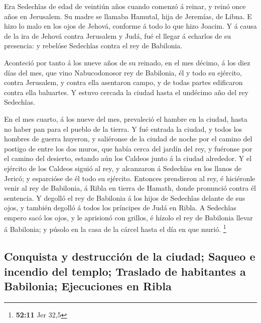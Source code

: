  Era Sedechîas de edad de veintiún años cuando comenzó á
reinar, y reinó once años en Jerusalem. Su madre se llamaba Hamutal,
hija de Jeremías, de Libna.  E hizo lo malo en los ojos de
Jehová, conforme á todo lo que hizo Joacim.  Y á causa de
la ira de Jehová contra Jerusalem y Judá, fué el llegar á echarlos de su
presencia: y rebelóse Sedechîas contra el rey de Babilonia.

 Aconteció por tanto á los nueve años de su reinado, en el
mes décimo, á los diez días del mes, que vino Nabucodonosor rey de
Babilonia, él y todo su ejército, contra Jerusalem, y contra ella
asentaron campo, y de todas partes edificaron contra ella baluartes.
 Y estuvo cercada la ciudad hasta el undécimo año del rey
Sedechîas.

 En el mes cuarto, á los nueve del mes, prevaleció el
hambre en la ciudad, hasta no haber pan para el pueblo de la tierra.
 Y fué entrada la ciudad, y todos los hombres de guerra
huyeron, y saliéronse de la ciudad de noche por el camino del postigo de
entre los dos muros, que había cerca del jardín del rey, y fuéronse por
el camino del desierto, estando aún los Caldeos junto á la ciudad
alrededor.  Y el ejército de los Caldeos siguió al rey, y
alcanzaron á Sedechîas en los llanos de Jericó; y esparcióse de él todo
su ejército.  Entonces prendieron al rey, é hiciéronle
venir al rey de Babilonia, á Ribla en tierra de Hamath, donde pronunció
contra él sentencia.  Y degolló el rey de Babilonia á los
hijos de Sedechîas delante de sus ojos, y también degolló á todos los
príncipes de Judá en Ribla.  A Sedechîas empero sacó los
ojos, y le aprisionó con grillos, é hízolo el rey de Babilonia llevar á
Babilonia; y púsolo en la casa de la cárcel hasta el día en que murió.
\footnote{\textbf{52:11} Jer 32,5}

\hypertarget{conquista-y-destrucciuxf3n-de-la-ciudad-saqueo-e-incendio-del-templo-traslado-de-habitantes-a-babilonia-ejecuciones-en-ribla}{%
\subsection{Conquista y destrucción de la ciudad; Saqueo e incendio del
templo; Traslado de habitantes a Babilonia; Ejecuciones en
Ribla}\label{conquista-y-destrucciuxf3n-de-la-ciudad-saqueo-e-incendio-del-templo-traslado-de-habitantes-a-babilonia-ejecuciones-en-ribla}}

